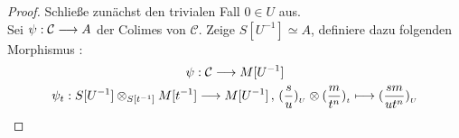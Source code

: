 \documentclass[10pt,a4paper]{report}
\newcommand{\comment}[1]{}
\newcommand{\functionfront}[3]{\nolinebreak{#1:#2 \longrightarrow #3}}
\newcommand{\function}[5]{\nolinebreak{#1:#2 \longrightarrow #3 \, , \, #4 \longmapsto #5}}
\newcommand{\Tensor}[3]{#1 \otimes_{#2} #3}
\newcommand{\tensor}[3]{#1 \otimes #3}
\newcommand{\lok}[2]{#1 [#2^{-1}]}
\newcommand{\loke}[3]{(\frac{#1}{#2})_{_{#3}}}
\begin{document}
\begin{proof}
Schließe zunächst den trivialen Fall $0 \in U$ aus.\\
Sei $\functionfront{\psi}{\mathcal{C}}{A}$ der Colimes von $\mathcal{C}$. Zeige $\lok{S}{U} \simeq A$, definiere dazu folgenden Morphismus \comment{\label{das phi ein Mophismus ist überlasse ich dem Leser}}:
\begin{gather*}
\functionfront{\psi}{\mathcal{C}}{\lok{M}{U}} \\
\comment{
\function{\psi_{\Tensor{\lok{S}{U}}{\lok{S}{t}}{\lok{M}{t}}}}{\Tensor{\lok{S}{U}}{\lok{S}{t}}{\lok{M}{t}}}{\lok{M}{U}}{\tensor{\loke{s}{u}{U}}{\lok{S}{t}}{\loke{m}{t^n}{t}}}{\loke{sm}{ut^n}{U}} \\
}
\function{\psi_{t}}{\Tensor{\lok{S}{U}}{\lok{S}{t}}{\lok{M}{t}}}{\lok{M}{U}}{\tensor{\loke{s}{u}{U}}{\lok{S}{t}}{\loke{m}{t^n}{t}}}{\loke{sm}{ut^n}{U}}
\end{gather*}


\end{proof}
\end{document}
